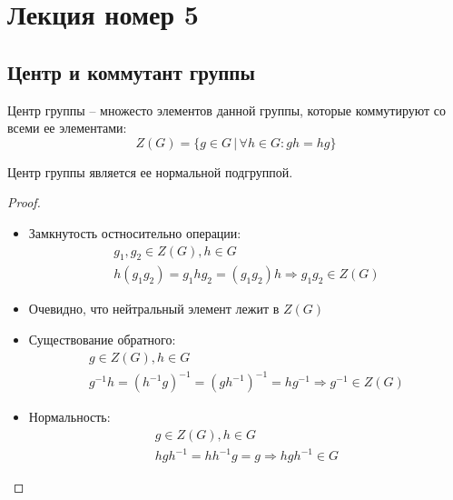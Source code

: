 \section{Лекция номер 5}
\subsection{Центр и коммутант группы}
\begin{conj}
    Центр группы -- множесто элементов данной группы, которые коммутируют со всеми ее элементами:
    \[ Z(G) = \{ g \in G \, | \, \forall h \in G : gh = hg \} \]
\end{conj}

\begin{theorem}
    Центр группы является ее нормальной подгруппой.
\end{theorem}
\begin{proof} \quad \\
    \begin{itemize}
        \item Замкнутость остносительно операции: 
        \begin{gather*}
            g_1, g_2 \in Z(G), h \in G \\
            h(g_1g_2) = g_1hg_2 = (g_1g_2)h \Rightarrow g_1g_2 \in Z(G)
        \end{gather*}
        \item Очевидно, что нейтральный элемент лежит в $Z(G)$
        \item Существование обратного:
        \begin{gather*}
            g \in Z(G), h \in G \\
            g^{-1}h = (h^{-1}g)^{-1} = (gh^{-1})^{-1} = hg^{-1} \Rightarrow g^{-1} \in Z(G)
        \end{gather*}
        \item Нормальность:
        \begin{gather*}
            g \in Z(G), h \in G \\
            hgh^{-1} = hh^{-1}g = g \Rightarrow hgh^{-1} \in G
        \end{gather*}
    \end{itemize}
\end{proof}

